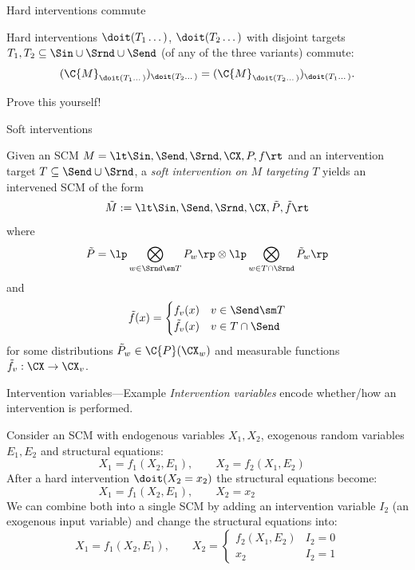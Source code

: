 \begin{frame}{Hard interventions commute}

\begin{Prp}[\ref{prp:hard_interventions_commute}]
Hard interventions $\doit(T_1\dots)$, $\doit(T_2\dots)$ with disjoint targets $T_1, T_2 \subseteq \Sin \cup \Srnd \cup \Send$ (of any of the three variants) commute:
  $$(\C{M}_{\doit(T_1\dots)})_{\doit(T_2\dots)} = (\C{M}_{\doit(T_2\dots)})_{\doit(T_1\dots)}.$$
\end{Prp}
Prove this yourself!
\end{frame}

\begin{frame}{Soft interventions}
\begin{Def}[\ref{def:scm_soft_intervention}]
  Given an SCM $M = \lt \Sin, \Send, \Srnd, \CX, P, f \rt$
  and an intervention target $T \subseteq \Send \cup \Srnd$, a \emph{soft intervention on $M$ targeting $T$}
  yields an intervened SCM of the form
  $$\tilde{M} := \lt \Sin,\Send,\Srnd,\CX,\tilde{P},\tilde{f} \rt$$
  where
  $$\tilde{P} = \lp\bigotimes_{w \in \Srnd \sm T} P_w \rp \otimes \lp \bigotimes_{w \in T \cap \Srnd} \tilde{P}_w \rp$$
  and
  $$\tilde{f}(x) = \begin{cases}
      f_v(x) & v \in \Send\sm T \\
      \tilde{f}_v(x) & v \in T \cap \Send \\
  \end{cases}$$
  for some distributions $\tilde{P}_w \in \C{P}(\CX_w)$ and measurable functions $\tilde{f}_v : \CX \to \CX_v$.
\end{Def}
\end{frame}

\begin{frame}{Intervention variables---Example}
  \emph{Intervention variables} encode whether/how an intervention is performed.
  \begin{example}
    Consider an SCM with endogenous variables $X_1,X_2$, exogenous random variables $E_1,E_2$ and structural equations:
    $$X_1 = f_1(X_2,E_1), \qquad
      X_2 = f_2(X_1,E_2) \phantom{x_2}$$
    After a hard intervention $\doit(X_2=x_2)$ the structural equations become:
    $$X_1 = f_1(X_2,E_1), \qquad
      X_2 = x_2 \phantom{f_2(X_1,E_2)}$$
    We can combine both into a single SCM by adding an intervention variable $I_2$ (an exogenous input variable) and change the structural equations into:
    $$X_1 = f_1(X_2,E_1), \qquad
      X_2 = \begin{cases}
        f_2(X_1,E_2) & I_2 = 0 \\
        x_2          & I_2 = 1
      \end{cases}$$
  \end{example}
\end{frame}

